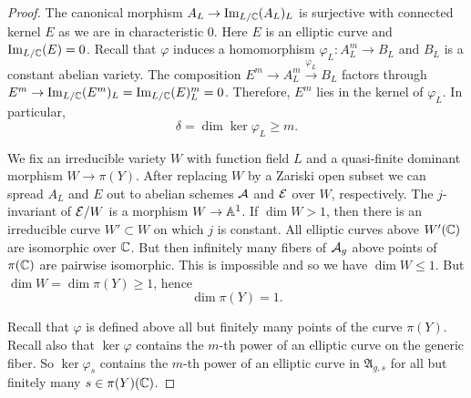 \documentclass[12pt,oneside]{amsart}
\begin{document}
\begin{proof}
  The canonical morphism $A_L\rightarrow \mathrm{Im}_{L/{\mathbb{C}}}(A_L)_L$
  is surjective with connected kernel $E$ as we are in characteristic
  $0$. Here $E$ is an elliptic curve and $\mathrm{Im}_{L/{\mathbb{C}}}(E)=0$.
  Recall that $\varphi$ induces a homomorphism $\varphi_L\colon
  A_L^m\rightarrow B_L$ and $B_L$ is a constant abelian
  variety. The composition $E^m \rightarrow A_L^m
  \xrightarrow{\varphi_L} B_L$ factors through $E^m\rightarrow
  \mathrm{Im}_{L/{\mathbb{C}}}(E^m)_L=  \mathrm{Im}_{L/{\mathbb{C}}}(E)_L^m=0$. Therefore,
  $E^m$ lies in the kernel of $\varphi_L$. In particular, 
  \begin{equation}
    \label{eq:dimkerlb}
    \delta = \dim\ker\varphi_L \ge m. 
  \end{equation}
  
  We fix an irreducible variety $W$ with function field $L$ and a
  quasi-finite dominant morphism $W\rightarrow \pi(Y)$. After replacing
  $W$ by a Zariski open subset we can spread $A_L$ and
  $E$ out to abelian schemes $\mathcal{A}$ and ${\mathcal E}$ over $W$, respectively.
  The $j$-invariant of ${\mathcal E}/W$ is a morphism
  $W\rightarrow{\mathbb{A}}^1$. If $\dim W > 1$, then there is an irreducible curve
  $W'\subset W$ on which $j$ is constant. All elliptic curves above
  $W'({\mathbb{C}})$ are isomorphic over ${\mathbb{C}}$. %
  But then
  infinitely many fibers of $\mathcal{A}_g$ above points of $\pi({\mathbb{C}})$ are
  pairwise isomorphic. This is impossible and so we have  $\dim W\le
  1$. But $\dim W = \dim \pi(Y)\ge 1$, hence
  \begin{equation}
    \label{eq:dimpiY1}
    \dim \pi(Y)=1.
  \end{equation}

  Recall that $\varphi$ is defined above all but finitely many points
  of the curve $\pi(Y)$. Recall also that $\ker\varphi$ contains the $m$-th power of
  an elliptic curve on the generic fiber. So $\ker\varphi_s$ contains
  the $m$-th power of an elliptic curve in $\mathfrak{A}_{g,s}$ for
  all but finitely many $s\in\pi(Y)({\mathbb{C}})$.  
  

\end{proof}
\end{document}
